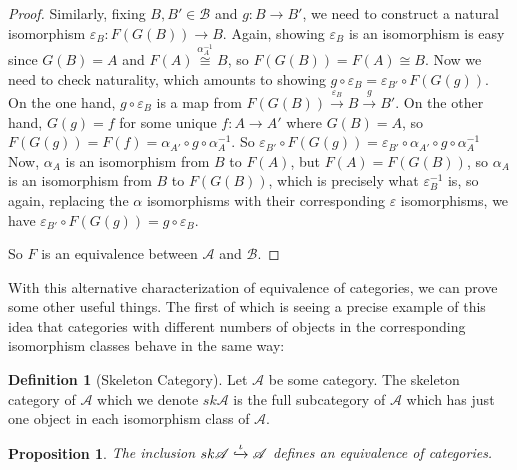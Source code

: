 \documentclass[11pt]{article}
\theoremstyle{definition}
\newtheorem*{defn}{Definition}
\theoremstyle{plain}
\theoremstyle{plain}
\newtheorem{prop}{Proposition}
\theoremstyle{plain}
\begin{document}
\begin{proof}
Similarly, fixing $B,B'\in\mathscr{B}$ and $g:B\to B'$, we need to construct a natural isomorphism $\varepsilon_{B} : F(G(B)) \to B$. Again, showing $\varepsilon_{B}$ is an isomorphism is easy since $G(B)=A$ and $F(A) \overset{\alpha_{A}^{-1}}{\cong} B$, so $F(G(B)) = F(A) \cong B$. Now we need to check naturality, which amounts to showing $g \circ \varepsilon_{B} = \varepsilon_{B'} \circ F(G(g))$. On the one hand, $g \circ \varepsilon_{B}$ is a map from $F(G(B)) \overset{\varepsilon_{B}}{\rightarrow} B \overset{g}{\rightarrow} B'$. On the other hand, $G(g)=f$ for some unique $f:A \to A'$ where $G(B) = A$, so $F(G(g)) = F(f) = \alpha_{A'} \circ g \circ \alpha_{A}^{-1}$. So $\varepsilon_{B'} \circ F(G(g)) = \varepsilon_{B'} \circ \alpha_{A'} \circ g \circ \alpha_{A}^{-1}$ Now, $\alpha_{A}$ is an isomorphism from $B$ to $F(A)$, but $F(A) = F(G(B))$, so $\alpha_{A}$ is an isomorphism from $B$ to $F(G(B))$, which is precisely what $\varepsilon_{B}^{-1}$ is, so again, replacing the $\alpha$ isomorphisms with their corresponding $\varepsilon$ isomorphisms, we have $\varepsilon_{B'} \circ F(G(g)) = g \circ \varepsilon_{B}$.

So $F$ is an equivalence between $\mathscr{A}$ and $\mathscr{B}$.

\end{proof}

With this alternative characterization of equivalence of categories, we can prove some other useful things. The first of which is seeing a precise example of this idea that categories with different numbers of objects in the corresponding isomorphism classes behave in the same way:

\begin{defn}[Skeleton Category]
Let $\mathscr{A}$ be some category. The skeleton category of $\mathscr{A}$ which we denote $sk\mathscr{A}$ is the full subcategory of $\mathscr{A}$ which has just one object in each isomorphism class of $\mathscr{A}$.
\end{defn}

\begin{prop}
The inclusion $sk\mathscr{A}\overset{\iota}{\xhookrightarrow{}}\mathscr{A}$ defines an equivalence of categories.
\end{prop}
\end{document}
